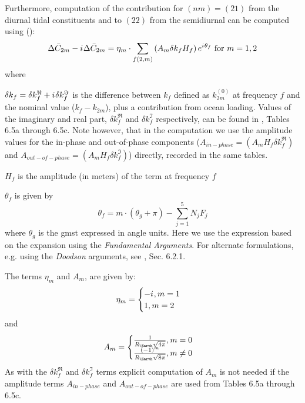 Furthermore, computation of the contribution for $(nm)=(21)$ from the 
diurnal tidal constituents and to $(22)$ from the semidiurnal can be computed using 
(\cite{iers2010}):
\begin{equation}
  \Delta \bar{C}_{2m} - {i\mkern1mu} \Delta \bar{C}_{2m} = 
    \eta _m \cdot \sum _{f(2,m)} \left( A_m \delta k_f H_f\right) e^{{i\mkern1mu} \theta _f} 
    \text{ for } m=1,2
  \label{eq:iers1068b}
\end{equation}
where 
\begin{description}
  \item $\delta k_f = \delta k^\Re _f + {i\mkern1mu} \delta k^\Im _f$ is the difference 
    between $k_f$ defined as $k^{(0)}_{2m}$ at frequency $f$ and the 
    nominal value ($k_f - k_{2m}$), plus a contribution from ocean 
    loading. Values of the imaginary and real part, $\delta k^\Re _f$ and 
    $\delta k^\Im _f$ respectively, can be found in \cite{iers2010}, Tables 6.5a 
    through 6.5c. Note however, that in the computation we use the amplitude values 
    for the in-phase and out-of-phase components ($A_{in-phase} = \left(A_m H_f \delta k^\Re _f \right)$ 
    and $A_{out-of-phase} = \left( A_m H_f \delta k^\Im _f \right)$) directly, recorded 
    in the same tables.
  \item $H_f$ is the amplitude (in meters) of the term at frequency $f$
  \item $\theta _f$ is given by 
    \begin{equation} \theta _f = m \cdot ( \theta _g + \pi ) - \sum ^5_{j=1} N_j F_j \end{equation}
    where $\theta _g$ is the \gls{gmst} expressed in angle units.
    Here we use the expression based on the expansion using the \emph{Fundamental Arguments}. 
    For alternate formulations, e.g. using the \emph{Doodson} arguments, see 
    \cite{iers2010}, Sec. 6.2.1.
  \item The terms $\eta _m$ and $A_m$, are given by: 
    \begin{equation}
    \eta _m = 
      \begin{cases} -{i\mkern1mu} , m=1 \\ 1 , m=2\end{cases}
    \end{equation} and
    \begin{equation} 
      A_m = \begin{cases} 
          \frac{1}{R_{\Earth}\sqrt{4 \pi}}, m=0\\
          \frac{(-1)^m}{R_{\Earth}\sqrt{8 \pi}}, m \ne 0
      \end{cases}
    \end{equation}
    As with the $\delta k^\Re _f$ and $\delta k^\Im _f$ terms 
    explicit computation of $A_m$ is not needed if the 
    amplitude terms $A_{in-phase}$ and $A_{out-of-phase}$ are used from 
    \cite{iers2010} Tables 6.5a through 6.5c.
\end{description}


